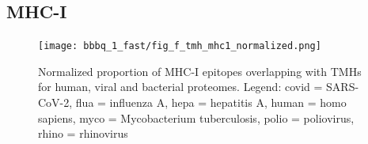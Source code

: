 

\subsection{MHC-I}

\begin{figure}[!htbp]
  \texttt{[image: bbbq\_1\_fast/fig\_f\_tmh\_mhc1\_normalized.png]}
  \caption{
    Normalized proportion of MHC-I epitopes overlapping with TMHs
    for human, viral and bacterial proteomes.
    Legend: covid = SARS-CoV-2, flua = influenza A, hepa = hepatitis A,
    human = homo sapiens, myco = Mycobacterium tuberculosis, 
    polio = poliovirus, rhino = rhinovirus
  }
  \label{fig:f_tmh_mhc1_normalized}
\end{figure}






%   

%   

